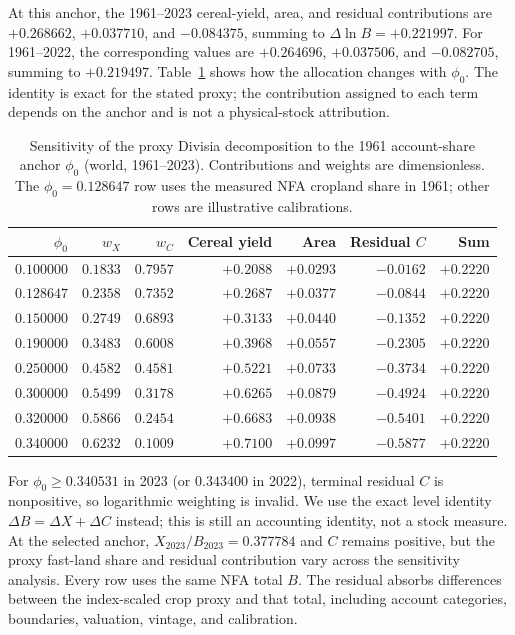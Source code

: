 \documentclass[11pt,a4paper]{article}
\begin{document}
At this anchor, the 1961--2023 cereal-yield, area, and residual contributions are $+0.268662$, $+0.037710$, and $-0.084375$, summing to $\Delta\ln B=+0.221997$. For 1961--2022, the corresponding values are $+0.264696$, $+0.037506$, and $-0.082705$, summing to $+0.219497$. Table~\ref{tab:si_phi0} shows how the allocation changes with $\phi_0$. The identity is exact for the stated proxy; the contribution assigned to each term depends on the anchor and is not a physical-stock attribution.

\begin{table}[htbp]
\centering\footnotesize
\caption{Sensitivity of the proxy Divisia decomposition to the 1961 account-share anchor $\phi_0$ (world, 1961--2023). Contributions and weights are dimensionless. The $\phi_0=0.128647$ row uses the measured NFA cropland share in 1961; other rows are illustrative calibrations.}
\label{tab:si_phi0}
\begin{tabular}{r r r r r r r}
\toprule
$\phi_0$ & $w_X$ & $w_C$ & Cereal yield & Area & Residual $C$ & Sum \\
\midrule
$0.100000$ & $0.1833$ & $0.7957$ & $+0.2088$ & $+0.0293$ & $-0.0162$ & $+0.2220$ \\
$0.128647$ & $0.2358$ & $0.7352$ & $+0.2687$ & $+0.0377$ & $-0.0844$ & $+0.2220$ \\
$0.150000$ & $0.2749$ & $0.6893$ & $+0.3133$ & $+0.0440$ & $-0.1352$ & $+0.2220$ \\
$0.190000$ & $0.3483$ & $0.6008$ & $+0.3968$ & $+0.0557$ & $-0.2305$ & $+0.2220$ \\
$0.250000$ & $0.4582$ & $0.4581$ & $+0.5221$ & $+0.0733$ & $-0.3734$ & $+0.2220$ \\
$0.300000$ & $0.5499$ & $0.3178$ & $+0.6265$ & $+0.0879$ & $-0.4924$ & $+0.2220$ \\
$0.320000$ & $0.5866$ & $0.2454$ & $+0.6683$ & $+0.0938$ & $-0.5401$ & $+0.2220$ \\
$0.340000$ & $0.6232$ & $0.1009$ & $+0.7100$ & $+0.0997$ & $-0.5877$ & $+0.2220$ \\
\bottomrule
\end{tabular}
\end{table}

For $\phi_0\ge0.340531$ in 2023 (or $0.343400$ in 2022), terminal residual $C$ is nonpositive, so logarithmic weighting is invalid. We use the exact level identity $\Delta B=\Delta X+\Delta C$ instead; this is still an accounting identity, not a stock measure. At the selected anchor, $X_{2023}/B_{2023}=0.377784$ and $C$ remains positive, but the proxy fast-land share and residual contribution vary across the sensitivity analysis. Every row uses the same NFA total $B$. The residual absorbs differences between the index-scaled crop proxy and that total, including account categories, boundaries, valuation, vintage, and calibration.
\end{document}
